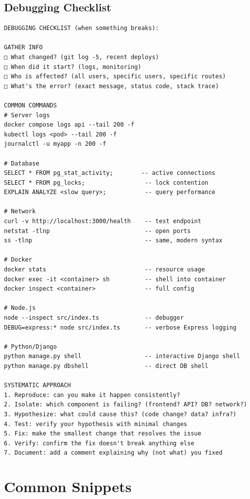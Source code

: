 \documentclass[10pt, a4paper]{article}
\begin{document}
\subsection{Debugging Checklist}


\begin{lstlisting}
DEBUGGING CHECKLIST (when something breaks):

GATHER INFO
□ What changed? (git log -5, recent deploys)
□ When did it start? (logs, monitoring)
□ Who is affected? (all users, specific users, specific routes)
□ What's the error? (exact message, status code, stack trace)

COMMON COMMANDS
# Server logs
docker compose logs api --tail 200 -f
kubectl logs <pod> --tail 200 -f
journalctl -u myapp -n 200 -f

# Database
SELECT * FROM pg_stat_activity;        -- active connections
SELECT * FROM pg_locks;                 -- lock contention
EXPLAIN ANALYZE <slow query>;           -- query performance

# Network
curl -v http://localhost:3000/health    -- test endpoint
netstat -tlnp                           -- open ports
ss -tlnp                                -- same, modern syntax

# Docker
docker stats                            -- resource usage
docker exec -it <container> sh          -- shell into container
docker inspect <container>              -- full config

# Node.js
node --inspect src/index.ts             -- debugger
DEBUG=express:* node src/index.ts       -- verbose Express logging

# Python/Django
python manage.py shell                  -- interactive Django shell
python manage.py dbshell                -- direct DB shell

SYSTEMATIC APPROACH
1. Reproduce: can you make it happen consistently?
2. Isolate: which component is failing? (frontend? API? DB? network?)
3. Hypothesize: what could cause this? (code change? data? infra?)
4. Test: verify your hypothesis with minimal changes
5. Fix: make the smallest change that resolves the issue
6. Verify: confirm the fix doesn't break anything else
7. Document: add a comment explaining why (not what) you fixed
\end{lstlisting}


\bigskip


\section{Common Snippets}
\end{document}
